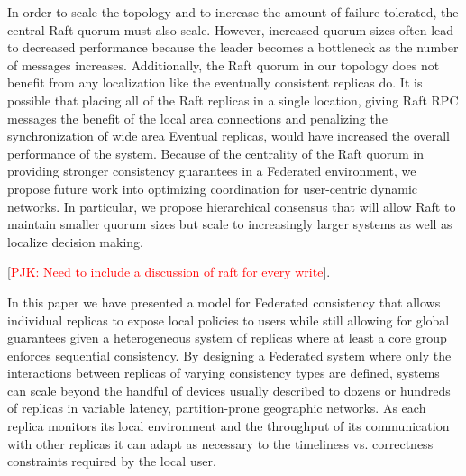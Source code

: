 \documentclass[10pt,conference,letterpaper]{IEEEtran}
\newcommand{\todo}[1]{{\textcolor{red}{#1}}}
\newcommand{\pjk}[1]{[\todo{PJK: #1}]}
\begin{document}
In order to scale the topology and to increase the amount of failure tolerated, the central Raft quorum must also scale. However, increased quorum sizes often lead to decreased performance because the leader becomes a bottleneck as the number of messages increases. Additionally, the Raft quorum in our topology does not benefit from any localization like the eventually consistent replicas do. It is possible that placing all of the Raft replicas in a single location, giving Raft RPC messages the benefit of the local area connections and penalizing the synchronization of wide area Eventual replicas, would have increased the overall performance of the system. Because of the centrality of the Raft quorum in providing stronger consistency guarantees in a Federated environment, we propose future work into optimizing coordination for user-centric dynamic networks. In particular, we propose hierarchical consensus that will allow Raft to maintain smaller quorum sizes but scale to increasingly larger systems as well as localize decision making.

\pjk{Need to include a discussion of raft for every write}.

In this paper we have presented a model for Federated consistency that allows individual replicas to expose local policies to users while still allowing for global guarantees given a heterogeneous system of replicas where at least a core group enforces sequential consistency. By designing a Federated system where only the interactions between replicas of varying consistency types are defined, systems can scale beyond the handful of devices usually described to dozens or hundreds of replicas in variable latency, partition-prone geographic networks. As each replica monitors its local environment and the throughput of its communication with other replicas it can adapt as necessary to the timeliness vs. correctness constraints required by the local user.

%



\end{document}
